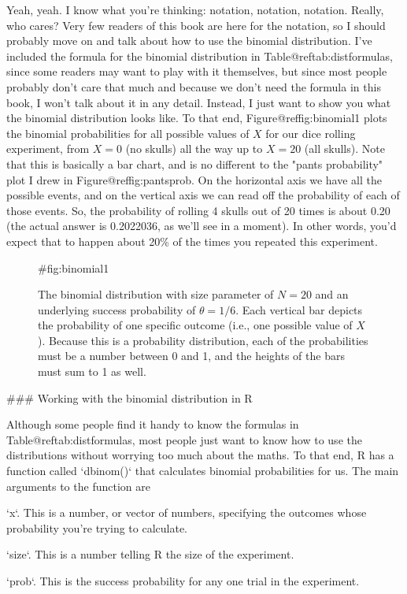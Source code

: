 Yeah, yeah. I know what you're thinking: notation, notation, notation. Really, who cares? Very few readers of this book are here for the notation, so I should probably move on and talk about how to use the binomial distribution. I've included the formula for the binomial distribution in Table@reftab:distformulas, since some readers may want to play with it themselves, but since most people probably don't care that much and because we don't need the formula in this book, I won't talk about it in any detail. Instead, I just want to show you what the binomial distribution looks like. To that end, Figure@reffig:binomial1 plots the binomial probabilities for all possible values of $X$ for our dice rolling experiment, from $X=0$ (no skulls) all the way up to $X=20$ (all skulls). Note that this is basically a bar chart, and is no different to the "pants probability" plot I drew in Figure@reffig:pantsprob. On the horizontal axis we have all the possible events, and on the vertical axis we can read off the probability of each of those events. So, the probability of rolling 4 skulls out of 20 times is about 0.20 (the actual answer is 0.2022036, as we'll see in a moment). In other words, you'd expect that to happen about 20\% of the times you repeated this experiment.


\begin{figure}[t]
\begin{center}
\caption{The binomial distribution with size parameter of $N=20$ and an underlying success probability of $\theta = 1/6$. Each vertical bar depicts the probability of one specific outcome (i.e., one possible value of $X$). Because this is a probability distribution, each of the probabilities must be a number between 0 and 1, and the heights of the bars must sum to 1 as well.}
\HR
{#fig:binomial1}
\end{center}
\end{figure}


### Working with the binomial distribution in R


Although some people find it handy to know the formulas in Table@reftab:distformulas, most people just want to know how to use the distributions without worrying too much about the maths. To that end, R has a function called `dbinom()` that calculates binomial probabilities for us. The main arguments to the function are 

\item `x`. This is a number, or vector of numbers, specifying the outcomes whose probability you're trying to calculate.
\item `size`. This is a number telling R the size of the experiment.
\item `prob`. This is the success probability for any one trial in the experiment.

